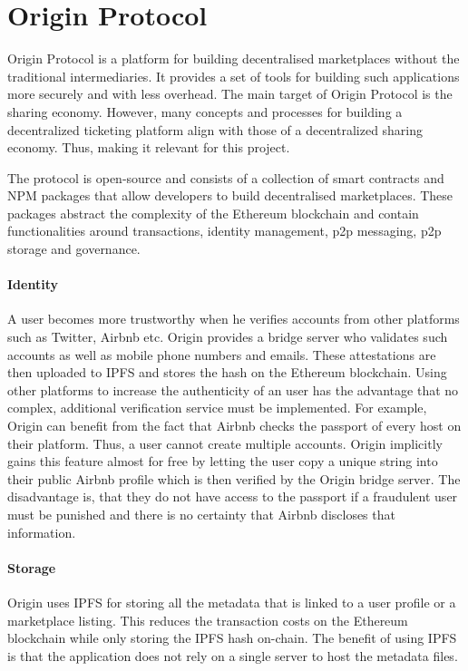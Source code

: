 
\section{Origin Protocol} 
Origin Protocol \cite{origin-protocol-whitepaper} is a platform for building decentralised marketplaces without the traditional intermediaries. It provides a set of tools for building such applications more securely and with less overhead. The main target of Origin Protocol is the sharing economy. However, many concepts and processes for building a decentralized ticketing platform align with those of a decentralized sharing economy. Thus, making it relevant for this project.

The protocol is open-source and consists of a collection of smart contracts and NPM packages that allow developers to build decentralised marketplaces. These packages abstract the complexity of the Ethereum blockchain and contain functionalities around transactions, identity management, p2p messaging, p2p storage and governance.

\paragraph{Identity}
A user becomes more trustworthy when he verifies accounts from other platforms such as Twitter, Airbnb etc. Origin provides a bridge server who validates such accounts as well as mobile phone numbers and emails. These attestations are then uploaded to IPFS and stores the hash on the Ethereum blockchain. 
Using other platforms to increase the authenticity of an user has the advantage that no complex, additional verification service must be implemented. 
For example, Origin can benefit from the fact that Airbnb checks the passport of every host on their platform. Thus, a user cannot create multiple accounts. Origin implicitly gains this feature almost for free by letting the user copy a unique string into their public Airbnb profile which is then verified by the Origin bridge server.
The disadvantage is, that they do not have access to the passport if a fraudulent user must be punished and there is no certainty that Airbnb discloses that information.

\paragraph{Storage}
Origin uses IPFS for storing all the metadata that is linked to a user profile or a marketplace listing. This reduces the transaction costs on the Ethereum blockchain while only storing the IPFS hash on-chain. The benefit of using IPFS is that the application does not rely on a single server to host the metadata files. 

